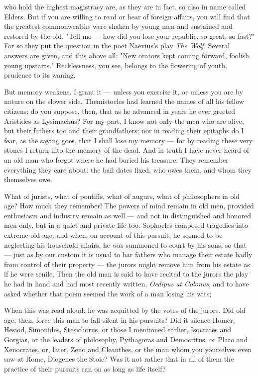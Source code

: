  who hold the highest magistracy are, as they are in fact, so also in name called Elders. But if you are willing to read or hear of foreign affairs, you will find that the greatest commonwealths were shaken by young men and sustained and restored by the old. "Tell me — how did you lose your republic, so great, so fast?" For so they put the question in the poet Naevius's play \textit{The Wolf}. Several answers are given, and this above all: "New orators kept coming forward, foolish young upstarts." Recklessness, you see, belongs to the flowering of youth, prudence to its waning.

 But memory weakens. I grant it — unless you exercise it, or unless you are by nature on the slower side. Themistocles had learned the names of all his fellow citizens; do you suppose, then, that as he advanced in years he ever greeted Aristides as Lysimachus? For my part, I know not only the men who are alive, but their fathers too and their grandfathers; nor in reading their epitaphs do I fear, as the saying goes, that I shall lose my memory — for by reading these very stones I return into the memory of the dead. And in truth I have never heard of an old man who forgot where he had buried his treasure. They remember everything they care about: the bail dates fixed, who owes them, and whom they themselves owe.

 What of jurists, what of pontiffs, what of augurs, what of philosophers in old age? How much they remember! The powers of mind remain in old men, provided enthusiasm and industry remain as well — and not in distinguished and honored men only, but in a quiet and private life too. Sophocles composed tragedies into extreme old age; and when, on account of this pursuit, he seemed to be neglecting his household affairs, he was summoned to court by his sons, so that — just as by our custom it is usual to bar fathers who manage their estate badly from control of their property — the jurors might remove him from his estate as if he were senile. Then the old man is said to have recited to the jurors the play he had in hand and had most recently written, \textit{Oedipus at Colonus}, and to have asked whether that poem seemed the work of a man losing his wits;

 When this was read aloud, he was acquitted by the votes of the jurors. Did old age, then, force this man to fall silent in his pursuits? Did it silence Homer, Hesiod, Simonides, Stesichorus, or those I mentioned earlier, Isocrates and Gorgias, or the leaders of philosophy, Pythagoras and Democritus, or Plato and Xenocrates, or, later, Zeno and Cleanthes, or the man whom you yourselves even saw at Rome, Diogenes the Stoic? Was it not rather that in all of them the practice of their pursuits ran on as long as life itself?

